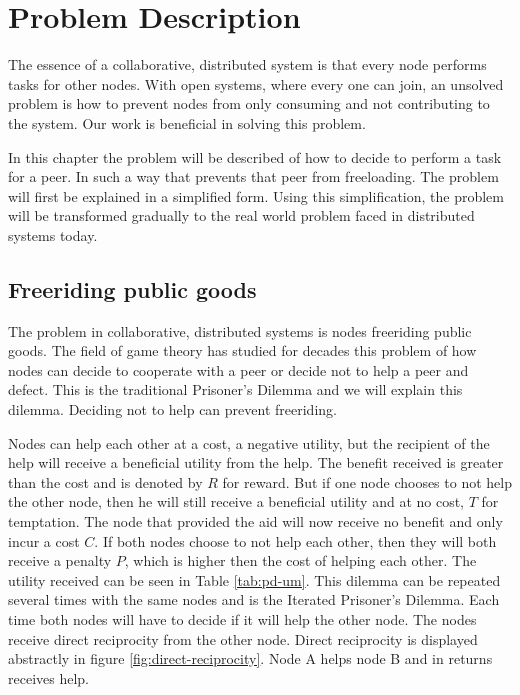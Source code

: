\chapter{Problem Description}
The essence of a collaborative, distributed system is that every node performs tasks for other nodes.
With open systems, where every one can join, an unsolved problem is how to prevent nodes
from only consuming and not contributing to the system.
Our work is beneficial in solving this problem.

In this chapter the problem will be described of how to decide to perform a task for a peer.
In such a way that prevents that peer from freeloading.
The problem will first be explained in a simplified form.
Using this simplification, the problem will be transformed gradually
to the real world problem faced in distributed systems today.

\section{Freeriding public goods}
The problem in collaborative, distributed systems is nodes freeriding public goods.
The field of game theory has studied for decades this problem of how
nodes can decide to cooperate with a peer or decide not to help a peer and defect.
This is the traditional Prisoner's Dilemma 
and we will explain this dilemma\cite{Nowak-PrisonerDilemma}\cite{Lai-Incentives}.
Deciding not to help can prevent freeriding.

Nodes can help each other at a cost, a negative utility, 
but the recipient of the help will receive a beneficial utility from the help.
The benefit received is greater than the cost and is denoted by $R$ for reward.
But if one node chooses to not help the other node,
 then he will still receive a beneficial utility and at no cost, $T$ for temptation.
The node that provided the aid will now receive no benefit and only incur a cost $C$.
If both nodes choose to not help each other, 
then they will both receive a penalty $P$, which is higher then the cost of helping each other.
The utility received can be seen in Table \ref{tab:pd-um}.
This dilemma can be repeated several times with the same nodes and is the Iterated Prisoner's Dilemma.
Each time both nodes will have to decide if it will help the other node.
The nodes receive direct reciprocity from the other node\cite{Nowak-Cooperation}.
Direct reciprocity is displayed abstractly in figure \ref{fig:direct-reciprocity}.
Node A helps node B and in returns receives help.


